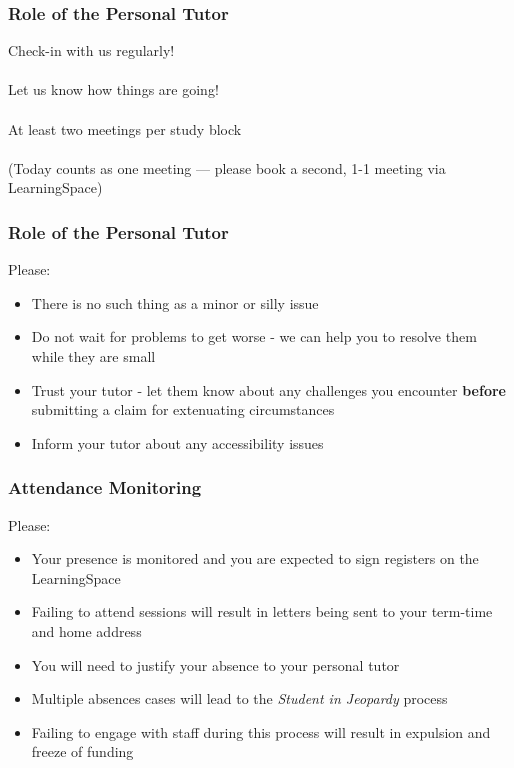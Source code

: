 \begin{frame}
	\frametitle{Role of the Personal Tutor}	
	
	\begin{center}
		Check-in with us regularly!
		\\~\\
		Let us know how things are going!
		\\~\\
		At least two meetings per study block
		\\~\\
		(Today counts as one meeting --- please book a second, 1-1 meeting via LearningSpace)
	\end{center}
\end{frame}

\begin{frame}
	\frametitle{Role of the Personal Tutor}	
	
	Please:
	
	\begin{itemize}
		\item There is no such thing as a minor or silly issue
		\item Do not wait for problems to get worse - we can help you to resolve them while they are small
		\item Trust your tutor - let them know about any challenges you encounter
		         \textbf{before} submitting a claim for extenuating circumstances
		\item Inform your tutor about any accessibility issues
	\end{itemize}
\end{frame}

\begin{frame}
	\frametitle{Attendance Monitoring}	
	
	Please:
	
	\begin{itemize}
		\item Your presence is monitored and you are expected to sign registers on the LearningSpace
		\item Failing to attend sessions will result in letters being sent to your term-time and home address
		\item You will need to justify your absence to your personal tutor
		\item Multiple absences cases will lead to the \textit{Student in Jeopardy} process
		\item Failing to engage with staff during this process will result in expulsion and freeze of funding
	\end{itemize}
\end{frame}


